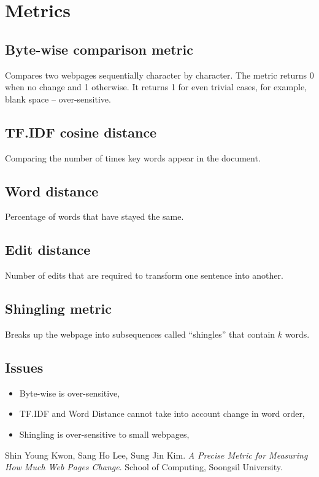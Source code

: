 \documentclass[10pt, a4paper]{article}
\begin{document}
\section{Metrics}
\subsection{Byte-wise comparison metric}
Compares two webpages sequentially character by character. The metric returns 0 when no change and 1 otherwise. It returns 1 for even trivial cases, for example, blank space -- over-sensitive.

\subsection{TF.IDF cosine distance}
Comparing the number of times key words appear in the document.

\subsection{Word distance}
Percentage of words that have stayed the same.

\subsection{Edit distance}
Number of edits that are required to transform one sentence into another.

\subsection{Shingling metric}
Breaks up the webpage into subsequences called ``shingles'' that contain $k$ words.

\subsection{Issues}
\begin{itemize}
	\item Byte-wise is over-sensitive,
	\item TF.IDF and Word Distance cannot take into account change in word order,
	\item Shingling is over-sensitive to small webpages,
	
\end{itemize}

\begin{thebibliography}{9}
Shin Young Kwon, Sang Ho Lee, Sung Jin Kim. 
\textit{A Precise Metric for Measuring How Much Web Pages Change}. 
School of Computing, Soongsil University.
\end{thebibliography}
\end{document}
